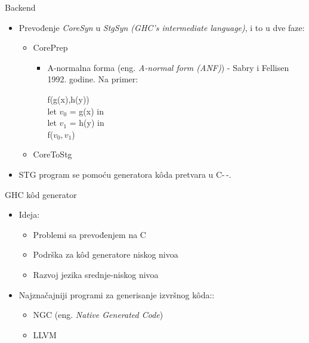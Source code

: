 \documentclass{beamer}
\begin{document}
\begin{frame}{Backend}

	\begin{itemize}
		\item 	Prevođenje \textit{CoreSyn} u \textit{StgSyn (GHC’s intermediate language)}, i to u dve faze:
		\begin{itemize}
			\item CorePrep 
			\begin{itemize}
				\item A-normalna forma (eng. \emph{A-normal form (ANF)}) -  Sabry i Fellisen 1992. godine.
				Na primer:
				\begin{block}{}
					f(g(x),h(y))\\
					let $ v_{0} $ = g(x) in \\
					let $ v_{1} $ = h(y) in  \\
					f($ v_{0}, v_{1} $) 
				\end{block}
				
			\end{itemize} 
			\item CoreToStg
		\end{itemize}
		
		\vspace{0.5cm}
		
		\item STG program se pomoću generatora k\^{o}da pretvara u C-\,-.
	\end{itemize}

\end{frame}

\begin{frame}{GHC k\^{o}d generator}
	
	\begin{itemize}
		\item Ideja:
		
		\begin{itemize}
			\item Problemi sa prevođenjem na C
			\item Podrška za k\^{o}d generatore niskog nivoa
			\item Razvoj jezika srednje-niskog nivoa
		\end{itemize}
	\end{itemize}

	\begin{itemize}
		\item Najznačajniji programi za generisanje izvršnog k\^{o}da::
		
		\begin{itemize}
			\item NGC (eng. \emph{Native Generated Code})
			\item LLVM
			
		\end{itemize}
	\end{itemize}
	
\end{frame}
\end{document}
